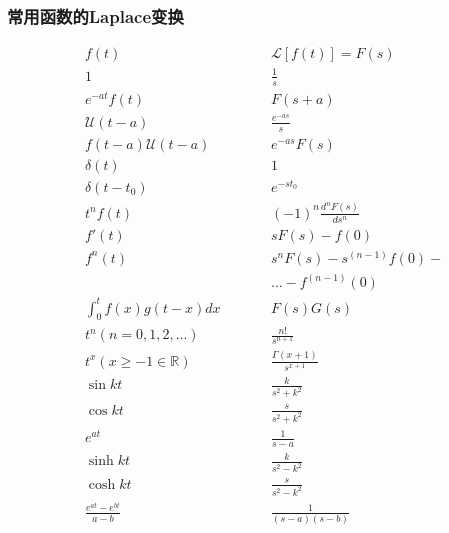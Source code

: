 \subsubsection{常用函数的Laplace变换}
\begin{multicols}{2}
    $$\begin{aligned}
        &f(t)&&\mathcal{L}[f(t)]=F(s)\\
        &1&&\frac1s\\
        &e^{-at}f(t)&&F(s+a)\\
        &\mathcal{U}(t-a)&&\frac{e^{-as}}s\\
        &f(t-a)\mathcal{U}(t-a)&&e^{-as}F(s)\\
        &\delta(t)&&1\\
        &\delta(t-t_0)&&e^{-st_0}\\
        &t^nf(t)&&(-1)^n\frac{d^nF(s)}{ds^n}\\
        &f'(t)&&sF(s)-f(0)\\
        &f^n(t)&&s^nF(s)-s^{(n-1)}f(0)-\\
        &&&...-f^{(n-1)}(0)\\
        &\int_0^tf(x)g(t-x)dx\qquad&&F(s)G(s)\\
        &t^n\left(n=0,1,2,\ldots\right)&&\frac{n!}{s^{n+1}}\\
        &t^x\left(x\geq-1\in\mathbb{R}\right)&&\frac{\Gamma(x+1)}{s^{x+1}}\\
        &\sin kt&&\frac k{s^2+k^2}\\
        &\cos kt &&\frac s{s^2+k^2}\\
        &e^{at}&&\frac1{s-a}\\
        &\sinh kt&&\frac k{s^2-k^2}\\
        &\cosh kt&&\frac s{s^2-k^2}\\
        &\frac{e^{at}-e^{bt}}{a-b}&&\frac1{(s-a)(s-b)}
        \end{aligned}$$


\end{multicols}
